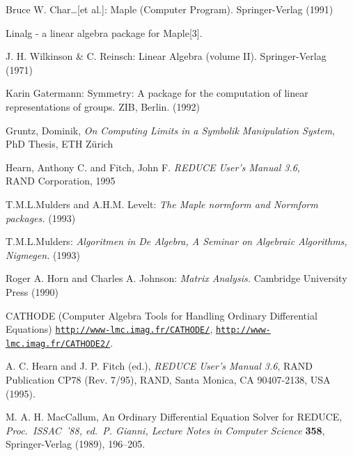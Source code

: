 \begin{thebibliography}{999}
 Bruce W. Char\ldots [et al.]: Maple (Computer 
        Program). Springer-Verlag (1991)

 Linalg - a linear algebra package for Maple[3].

 J. H. Wilkinson \& C. Reinsch: Linear Algebra 
(volume II). Springer-Verlag (1971)

 Karin Gatermann: Symmetry: A {\REDUCE} package for the 
computation of linear representations of groups. ZIB, Berlin. (1992)


 Gruntz, Dominik,
\textit{On Computing Limits in a Symbolik Manipulation System}, \\
PhD Thesis, ETH Z\"urich

 Hearn, Anthony C. and Fitch, John F.
\textit{REDUCE User's Manual 3.6}, \\ RAND Corporation, 1995


 T.M.L.Mulders and A.H.M. Levelt: {\it The Maple 
        normform and Normform packages.} (1993)

 T.M.L.Mulders: {\it Algoritmen in De Algebra, A 
        Seminar on Algebraic Algorithms, Nigmegen.} (1993)

 Roger A. Horn and Charles A. Johnson: {\it Matrix 
        Analysis.} Cambridge University Press (1990)




 CATHODE (Computer Algebra Tools for Handling
Ordinary Differential Equations)
\href{http://www-lmc.imag.fr/CATHODE/}%
{\texttt{http://www-lmc.imag.fr/CATHODE/}},
\href{http://www-lmc.imag.fr/CATHODE2/}%
{\texttt{http://www-lmc.imag.fr/CATHODE2/}}.

 A. C. Hearn and J. P. Fitch (ed.),
\textit{REDUCE User's Manual 3.6}, RAND Publication CP78 (Rev. 7/95),
RAND, Santa Monica, CA 90407-2138, USA (1995).

 M. A. H. MacCallum, An Ordinary Differential
Equation Solver for REDUCE, \textit{Proc.\ ISSAC~'88, ed.\ P. Gianni,
Lecture Notes in Computer Science} \textbf{358}, Springer-Verlag
(1989), 196--205.


\end{thebibliography}
